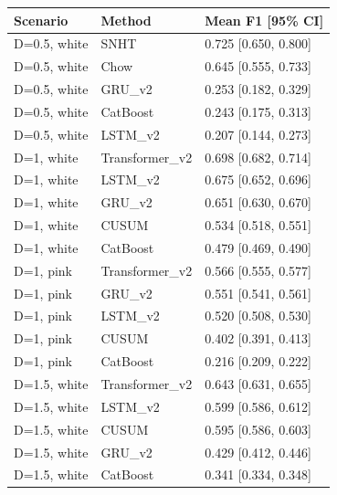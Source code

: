 \begin{tabular}{lll}
\toprule
Scenario & Method & Mean F1 [95\% CI] \\
\midrule
D=0.5, white & SNHT & 0.725 [0.650, 0.800] \\
D=0.5, white & Chow & 0.645 [0.555, 0.733] \\
D=0.5, white & GRU\_v2 & 0.253 [0.182, 0.329] \\
D=0.5, white & CatBoost & 0.243 [0.175, 0.313] \\
D=0.5, white & LSTM\_v2 & 0.207 [0.144, 0.273] \\
D=1, white & Transformer\_v2 & 0.698 [0.682, 0.714] \\
D=1, white & LSTM\_v2 & 0.675 [0.652, 0.696] \\
D=1, white & GRU\_v2 & 0.651 [0.630, 0.670] \\
D=1, white & CUSUM & 0.534 [0.518, 0.551] \\
D=1, white & CatBoost & 0.479 [0.469, 0.490] \\
D=1, pink & Transformer\_v2 & 0.566 [0.555, 0.577] \\
D=1, pink & GRU\_v2 & 0.551 [0.541, 0.561] \\
D=1, pink & LSTM\_v2 & 0.520 [0.508, 0.530] \\
D=1, pink & CUSUM & 0.402 [0.391, 0.413] \\
D=1, pink & CatBoost & 0.216 [0.209, 0.222] \\
D=1.5, white & Transformer\_v2 & 0.643 [0.631, 0.655] \\
D=1.5, white & LSTM\_v2 & 0.599 [0.586, 0.612] \\
D=1.5, white & CUSUM & 0.595 [0.586, 0.603] \\
D=1.5, white & GRU\_v2 & 0.429 [0.412, 0.446] \\
D=1.5, white & CatBoost & 0.341 [0.334, 0.348] \\
\bottomrule
\end{tabular}
